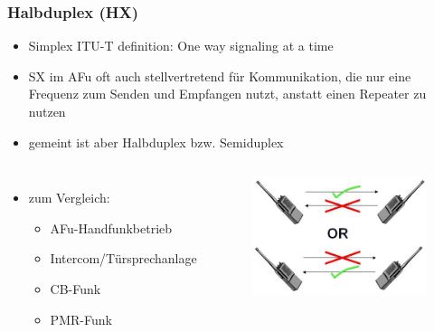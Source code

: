 \begin{frame}
  \frametitle{Halbduplex (HX)}

  \begin{itemize}
    \item Simplex ITU-T definition: One way signaling at a time
    \item SX im AFu oft auch stellvertretend für Kommunikation, die nur eine Frequenz
      zum Senden und Empfangen nutzt, anstatt einen Repeater zu nutzen
    \item gemeint ist aber Halbduplex bzw. Semiduplex
  \end{itemize}

  \begin{columns}
      \begin{itemize}
        \item zum Vergleich:
          \begin{itemize}
            \item AFu-Handfunkbetrieb
            \item Intercom/Türsprechanlage
            \item CB-Funk
            \item PMR-Funk
          \end{itemize}
      \end{itemize}

    \begin{center}
      \begin{figure}
        \includegraphics[width=\textwidth,height=.4\textheight,keepaspectratio]{bv11/HalfDuplex.jpg}
      \end{figure}
    \end{center}
  \end{columns}

\end{frame}

